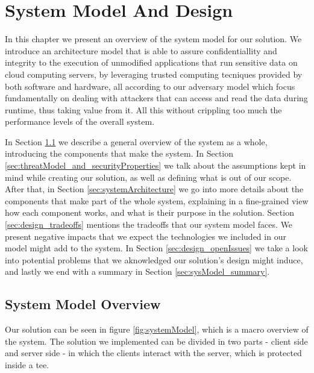 \chapter{System Model And Design}
\label{cha:systemModel_and_design}

In this chapter we present an overview of the system model for our solution. We introduce an architecture model that is able to assure confidentiallity and integrity to the execution of unmodified applications that run sensitive data on cloud computing servers, by leveraging trusted computing tecniques provided by both software and hardware, all according to our adversary model which focus fundamentally on dealing with attackers that can access and read the data during runtime, thus taking value from it. All this without crippling too much the performance levels of the overall system.

In Section \ref{sec:systemModel_overview} we describe a general overview of the system as a whole, introducing the components that make the system. In Section \ref{sec:threatModel_and_securityProperties} we talk about the assumptions kept in mind while creating our solution, as well as defining what is out of our scope.
After that, in Section \ref{sec:systemArchitecture} we go into more details about the components that make part of the whole system, explaining in a fine-grained view how each component works, and what is their purpose in the solution. 
Section \ref{sec:design_tradeoffs} mentions the tradeoffs that our system model faces. We present negative impacts that we expect the technologies we included in our model might add to the system.
In Section \ref{sec:design_openIssues} we take a look into potential problems that we aknowledged our solution's design might induce, and lastly we end with a summary in Section \ref{sec:sysModel_summary}.





\section{System Model Overview} %
\label{sec:systemModel_overview}

Our solution can be seen in figure \ref{fig:systemModel}, which is a macro overview of the system. 
The solution we implemented can be divided in two parts - client side and server side - in which the clients interact with the server, which is protected inside a \gls{tee}. 

